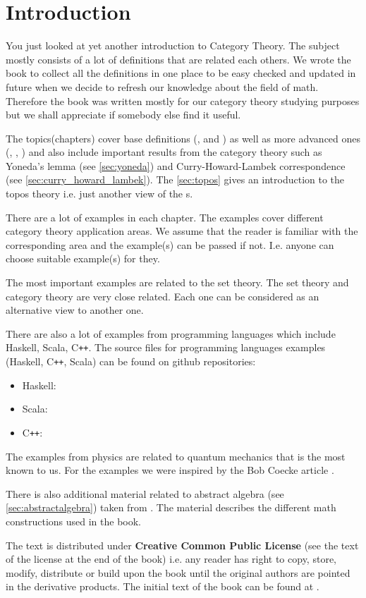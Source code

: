 \chapter*{Introduction}

You just looked at yet another introduction to Category Theory. The
subject mostly consists of a lot of definitions that are related each
others. We wrote the book to collect all the definitions in one
place to be easy checked and updated in future when we decide to refresh
our knowledge about the field of math. Therefore the book was written mostly
for our category theory studying purposes but we shall appreciate if
somebody else find it useful. 

The topics(chapters) cover base definitions
(,  and
) as well as more advanced ones (,
, ) and also include important
results from the category theory such as Yoneda's lemma (see
\cref{sec:yoneda}) and Curry-Howard-Lambek correspondence (see
\cref{sec:curry_howard_lambek}). The \cref{sec:topos} gives an
introduction to the topos theory i.e. just another view of the
s.

There are a lot of examples in each chapter. The examples cover
different category 
theory application areas. We assume that the reader is familiar with
the corresponding area and the example(s) can be passed if not. I.e.
anyone can choose suitable example(s) for they.

The most important examples are related to the set theory. The set
theory and category theory are very close related. Each one can be
considered as an alternative view to another one.

There are also a lot of examples from programming languages which include
Haskell, Scala, C\texttt{++}. The source files for programming languages 
examples (Haskell, C\texttt{++}, Scala) can be found on github repositories:
\begin{itemize}
\item Haskell: \cite{github:cattheory_hs_examples}
\item Scala: \cite{github:cattheory_scala_examples}
\item C\texttt{++}: \cite{github:cattheory_cpp_examples}
\end{itemize}

The examples from physics are related to quantum mechanics that is the
most known to us. For the examples we were inspired by the Bob Coecke
article \cite{bib:arxiv:Bob_Coecke_2008}.

There is also additional material related to abstract algebra (see
\cref{sec:abstractalgebra}) taken from
\cite{github:galois_ivanmurashko}. The material describes the
different math constructions used in the book.

The text is distributed under \textbf{Creative Common Public License}
(see the text of the license at the end of the book)
i.e. any reader has right to copy, store, modify, distribute or build
upon the book until the original authors are pointed in the derivative
products. The initial text of the book can be found at
\cite{github:cattheory_ivanmurashko}.  

